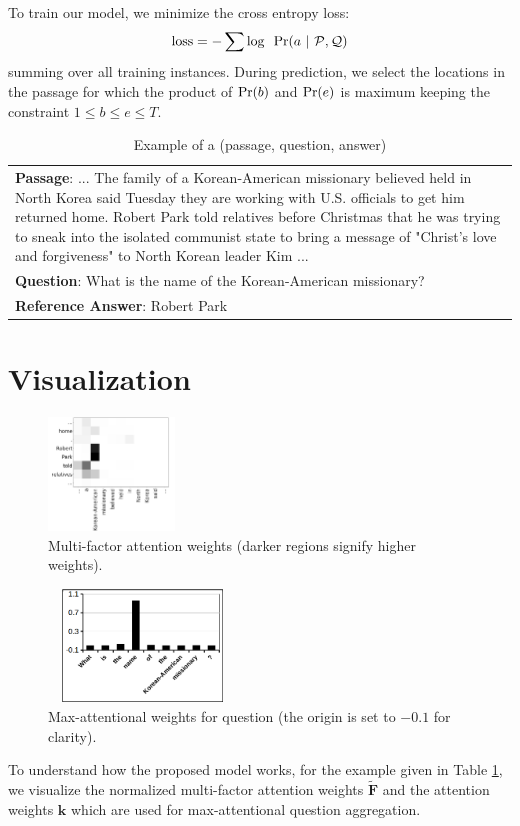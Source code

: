 \documentclass[letterpaper]{article}
\begin{document}
To train our model, we minimize the cross entropy loss:
\begin{equation}
\textnormal{loss} = - \sum \textnormal{log} ~~ \textnormal{Pr}(a ~|~ \mathcal{P},\mathcal{Q})
\end{equation}
summing over all training instances. During prediction, we select the locations in the passage for which the product of $\textnormal{Pr}(b)$ and $\textnormal{Pr}(e)$ is maximum keeping the constraint $1 \leq b \leq e \leq T$.
\begin{table}[t]
\centering
\begin{tabular}{|p{8.0cm}|}
\hline
\textbf{Passage}: ... The family of a Korean-American missionary believed held in North Korea said Tuesday they are working with U.S. officials to get him returned home. Robert Park told relatives before Christmas that he was trying to sneak into the isolated communist state to bring a message of "Christ's love and forgiveness" to North Korean leader Kim ... \\
\textbf{Question}: What is the name of the Korean-American missionary? \\
\textbf{Reference Answer}: Robert Park \\ \hline
\end{tabular}
\caption{Example of a (passage, question, answer)}
\label{tab:ex2}
\end{table}


\section{Visualization}
\label{sec:visualization}
\begin{figure}[t]
\centering
\includegraphics[width=0.3\textwidth]{short_mfa.png}
\caption{Multi-factor attention weights (darker regions signify higher weights).}
\label{fig:ex_mfa}
\end{figure}
\begin{figure}[t]
\centering
\includegraphics[width=5cm,height=3cm]{qma.png}
\caption{Max-attentional weights for question (the origin is set to $-0.1$ for clarity).}
\label{fig:ex_qma}
\end{figure}
To understand how the proposed model works, for the example given in Table \ref{tab:ex2}, we visualize the normalized multi-factor attention weights $\mathbf{\tilde{F}}$ and the attention weights $\mathbf{k}$ which are used for max-attentional question aggregation.
\end{document}
